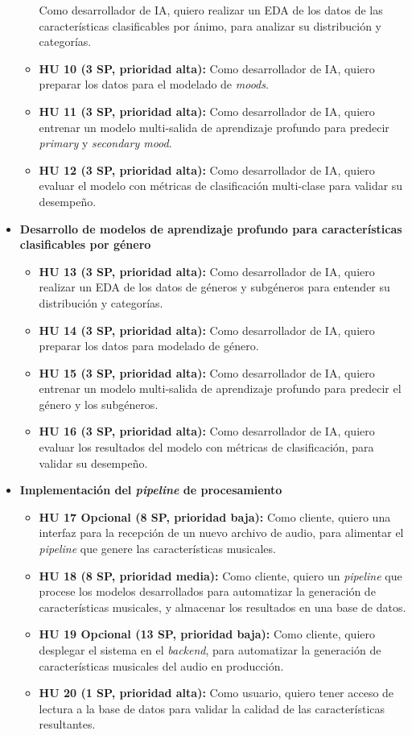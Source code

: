 \documentclass[
11pt, %
]{charter}
\begin{document}
\begin{itemize}
\begin{itemize}
      Como desarrollador de IA, quiero realizar un EDA de los datos de las características clasificables por ánimo, para analizar su distribución y categorías.
      \item \textbf{HU 10 (3 SP, prioridad alta):}
      Como desarrollador de IA, quiero preparar los datos para el modelado de \textit{moods}.
      \item \textbf{HU 11 (3 SP, prioridad alta):}
      Como desarrollador de IA, quiero entrenar un modelo multi-salida de aprendizaje profundo para predecir \textit{primary} y \textit{secondary mood}.
      \item \textbf{HU 12 (3 SP, prioridad alta):}
      Como desarrollador de IA, quiero evaluar el modelo con métricas de clasificación multi-clase para validar su desempeño.
    \end{itemize}
  \item \textbf{Desarrollo de modelos de aprendizaje profundo para características clasificables por género}
    \begin{itemize}
      \item \textbf{HU 13 (3 SP, prioridad alta):}
      Como desarrollador de IA, quiero realizar un EDA de los datos de géneros y subgéneros para entender su distribución y categorías.
      \item \textbf{HU 14 (3 SP, prioridad alta):}
      Como desarrollador de IA, quiero preparar los datos para modelado de género.
      \item \textbf{HU 15 (3 SP, prioridad alta):}
      Como desarrollador de IA, quiero entrenar un modelo multi-salida de aprendizaje profundo para predecir el género y los subgéneros.
      \item \textbf{HU 16 (3 SP, prioridad alta):}
      Como desarrollador de IA, quiero evaluar los resultados del modelo con métricas de clasificación, para validar su desempeño.
    \end{itemize}        
  \item \textbf{Implementación del  \textit{pipeline} de procesamiento}
    \begin{itemize}
      \item \textbf{HU 17 Opcional (8 SP, prioridad baja):}
      Como cliente, quiero una interfaz para la recepción de un nuevo archivo de audio, para alimentar el \textit{pipeline} que genere las características musicales.
      \item \textbf{HU 18 (8 SP, prioridad media):}
      Como cliente, quiero un  \textit{pipeline} que procese los modelos desarrollados para automatizar la generación de características musicales, y almacenar los resultados en una base de datos.
      \item \textbf{HU 19 Opcional (13 SP, prioridad baja):}
      Como cliente, quiero desplegar el sistema en el \textit{backend}, para automatizar la generación de características musicales del audio en producción.
      \item \textbf{HU 20 (1 SP, prioridad alta):}
      Como usuario, quiero tener acceso de lectura a la base de datos para validar la calidad de las características resultantes.
    \end{itemize}
\end{itemize}
\end{document}
